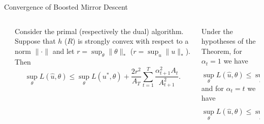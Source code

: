 \documentclass[final]{beamer}
\begin{document}
\begin{frame}{}
\begin{columns}
\begin{column}{0.50\linewidth}
\begin{block}{\large Convergence of Boosted Mirror Descent}
\begin{columns}[t]
\begin{column}{0.01\linewidth}\end{column}
\begin{column}{0.47\linewidth}
\begin{theorem}
Consider the primal (respectively the dual) algorithm. Suppose that $h$ ($R$) is strongly convex with respect to a norm $\|\cdot\|$ 
and let $r = \sup_{\theta} \|\theta\|_{*}$ ($r = \sup_{u} \|u\|_{*}$). Then
\[ \sup_{\theta} L(\hat{u}, \theta) \leq \sup_{\theta} L(u^*, \theta) + \frac{2r^2}{A_T} \sum_{t=1}^T \frac{\alpha_{t+1}^2A_t}{A_{t+1}^2}. \]
\end{theorem}
\end{column}
\begin{column}{0.47\linewidth}
\begin{corollary} 
Under the hypotheses of the Theorem, for $\alpha_{t} = 1$ we have
\[ \sup_{\theta} L(\hat{u}, \theta) \leq \sup_{\theta} L(u^*, \theta) + \frac{2r^2 (\log (T) + 1)}{T}. \]
and for $\alpha_t = t$ we have
\[ \sup_{\theta} L(\hat{u}, \theta) \leq \sup_{\theta} L(u^*, \theta) + \frac{8r^2}{T}. \]
\end{corollary}
\end{column}
\end{columns}
\end{block}

%
%
%
%
%


\end{column}
\end{columns}
\end{frame}
\end{document}
